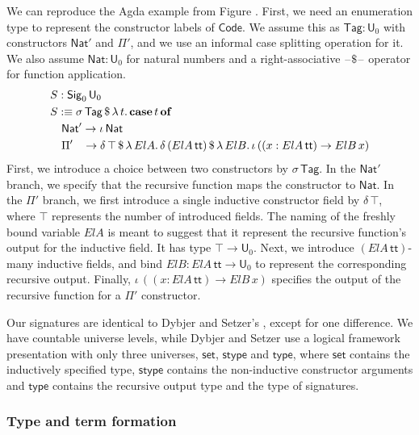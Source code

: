 \documentclass[acmsmall,screen,review,anonymous]{acmart}
\newcommand{\msf}[1]{{\mathsf{#1}}}
\newcommand{\mbf}[1]{{\mathbf{#1}}}
\newcommand{\U}{\msf{U}}
\newcommand{\Nat}{\msf{Nat}}
\newcommand{\Sig}{\msf{Sig}}
\newcommand{\Code}{\msf{Code}}
\newcommand{\Tag}{\msf{Tag}}
\newcommand{\case}{\mbf{case}}
\newcommand{\of}{\mbf{of}}
\newcommand{\ttt}{\msf{tt}}
\newcommand{\blank}{{\mathord{\hspace{1pt}\text{--}\hspace{1pt}}}}
\begin{document}
\begin{example}
We can reproduce the Agda example from Figure \cite{TODO}. First, we need an enumeration type to
represent the constructor labels of $\Code$. We assume this as $\Tag : \U_0$ with constructors
$\Nat'$ and $\Pi'$, and we use an informal case splitting operation for it. We also assume $\Nat :
\U_0$ for natural numbers and a right-associative $\blank\!\$\!\blank$ operator for function application.
\begin{alignat*}{4}
  & S : \Sig_0\,\U_0\\
  & S :\equiv \sigma\,\Tag\,\$\,\lambda\,t.\,\case\,t\,\of \\
  & \quad \Nat' \to \iota\,\Nat \\
  & \quad \Pi'\hspace{0.85em} \to \delta\,\top\,\$\,\lambda\,{ElA}.\, \delta\,({ElA}\,\ttt)\,\$\,\lambda\,{ElB}.\,
      \iota\, ((x : {ElA}\,\ttt) \to {ElB}\,x)
\end{alignat*}
First, we introduce a choice between two constructors by $\sigma\,\Tag$. In the $\Nat'$ branch, we
specify that the recursive function maps the constructor to $\Nat$. In the $\Pi'$ branch, we first
introduce a single inductive constructor field by $\delta\,\top$, where $\top$ represents the number
of introduced fields. The naming of the freshly bound variable ${ElA}$ is meant to suggest that it
represent the recursive function's output for the inductive field. It has type $\top \to \U_0$.
Next, we introduce $({ElA}\,\ttt)$-many inductive fields, and bind ${ElB} : {ElA}\,\ttt \to \U_0$ to
represent the corresponding recursive output. Finally, $\iota\, ((x : {ElA}\,\ttt) \to {ElB}\,x)$
specifies the output of the recursive function for a $\Pi'$ constructor.
\end{example}

Our signatures are identical to Dybjer and Setzer's \cite{TODO}, except for one difference.  We have
countable universe levels, while Dybjer and Setzer use a logical framework presentation with only
three universes, $\msf{set}$, $\msf{stype}$ and $\msf{type}$, where $\msf{set}$ contains the
inductively specified type, $\msf{stype}$ contains the non-inductive constructor arguments and
$\msf{type}$ contains the recursive output type and the type of signatures.

\subsubsection{Type and term formation}\label{sec:ir-type-and-term-formation}
\end{document}
